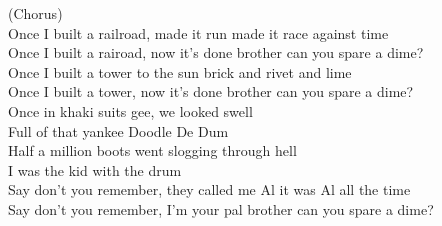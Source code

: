 (Chorus) \\ 
Once I built a railroad, made it run made it race against time \\ 
Once I built a rairoad, now it's done brother can you spare a dime? \\ 
Once I built a tower to the sun brick and rivet and lime \\ 
Once I built a tower, now it's done brother can you spare a dime? \\ 
Once in khaki suits gee, we looked swell \\ 
Full of that yankee Doodle De Dum \\ 
Half a million boots went slogging through hell \\ 
I was the kid with the drum \\ 
Say don't you remember, they called me Al it was Al all the time \\ 
Say don't you remember, I'm your pal brother can you spare a dime? \\ 
